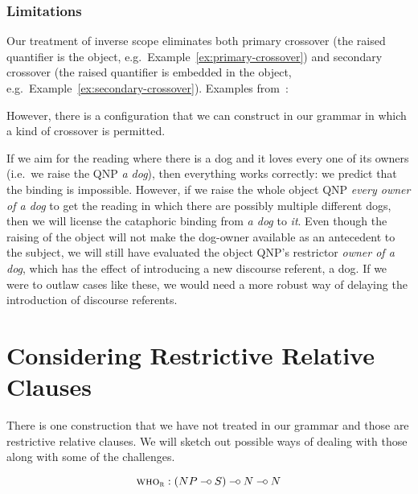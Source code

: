 \subsubsection{Limitations}

Our treatment of inverse scope eliminates both primary crossover (the
raised quantifier is the object, e.g.\ Example~\ref{ex:primary-crossover})
and secondary crossover (the raised quantifier is embedded in the object,
e.g.\ Example~\ref{ex:secondary-crossover}). Examples
from~\cite{shan2006explaining}:

\begin{exe}
\end{exe}

However, there is a configuration that we can construct in our grammar in
which a kind of crossover is permitted.

\begin{exe}
\end{exe}

If we aim for the reading where there is a dog and it loves every one of
its owners (i.e.\ we raise the QNP \emph{a dog}), then everything works
correctly: we predict that the binding is impossible. However, if we raise
the whole object QNP \emph{every owner of a dog} to get the reading in
which there are possibly multiple different dogs, then we will license the
cataphoric binding from \emph{a dog} to \emph{it}. Even though the raising
of the object will not make the dog-owner available as an antecedent to the
subject, we will still have evaluated the object QNP's restrictor
\emph{owner of a dog}, which has the effect of introducing a new discourse
referent, a dog. If we were to outlaw cases like these, we would need a
more robust way of delaying the introduction of discourse referents.


\section{Considering Restrictive Relative Clauses}
\label{sec:relative-clauses}

There is one construction that we have not treated in our grammar and those
are restrictive relative clauses. We will sketch out possible ways of
dealing with those along with some of the challenges.

$$
\textsc{who}_{\textsc{r}} : (NP \mathbin{{-}\mkern-3.5mu{\circ}} S) \mathbin{{-}\mkern-3.5mu{\circ}} N \mathbin{{-}\mkern-3.5mu{\circ}} N
$$


